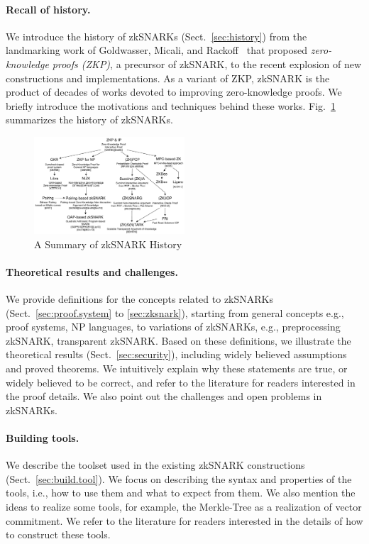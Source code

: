 \documentclass[acmtog]{acmart}
\begin{document}
\paragraph{Recall of history.} We introduce the history of zkSNARKs (Sect.~\ref{sec:history}) from the landmarking work of Goldwasser, Micali, and Rackoff~\cite{GoldwasserMR85} that proposed \emph{zero-knowledge proofs (ZKP)}, a precursor of zkSNARK, to the recent explosion of new constructions and implementations.
As a variant of ZKP, zkSNARK is the product of decades of works devoted to improving zero-knowledge proofs.
We briefly introduce the motivations and techniques behind these works.
Fig.~\ref{fig:history} summarizes the history of zkSNARKs.

\begin{figure}[ht!]
\includegraphics[width=0.5\textwidth]{images/zksnark-history.pdf}
\caption{A Summary of zkSNARK History}
\label{fig:history}
\Description{}
\end{figure}

\paragraph{Theoretical results and challenges.}
We provide definitions for the concepts related to zkSNARKs (Sect.~\ref{sec:proof.system} to \ref{sec:zksnark}), starting from general concepts e.g., proof systems, NP languages, to variations of zkSNARKs, e.g., preprocessing zkSNARK, transparent zkSNARK.
Based on these definitions, we illustrate the theoretical results (Sect.~\ref{sec:security}), including widely believed assumptions and proved theorems.
We intuitively explain why these statements are true, or widely believed to be correct, and refer to the literature for readers interested in the proof details.
We also point out the challenges and open problems in zkSNARKs.

\paragraph{Building tools.}
We describe the toolset used in the existing zkSNARK constructions (Sect.~\ref{sec:build.tool}).
We focus on describing the syntax and properties of the tools, i.e., how to use them and what to expect from them.
We also mention the ideas to realize some tools, for example, the Merkle-Tree as a realization of vector commitment.
We refer to the literature for readers interested in the details of how to construct these tools.
\end{document}
